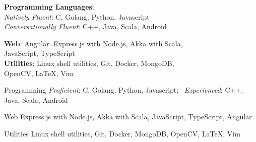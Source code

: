 \ifdefined\ONEPAGE
\textbf{Programming Languages}:\\
\quad \textit{Natively Fluent}: C, Golang, Python, Javascript\\
\quad \textit{Conversationally Fluent}: C++, Java, Scala, Android

\textbf{Web}:
Angular. Express.js with Node.js, Akka with Scala,\\
\quad JavaScript, TypeScript\\

\textbf{Utilities}:
Linux shell utilities, Git, Docker, MongoDB,\\
\quad OpenCV, \LaTeX, Vim
\else
\begin{cvskills}

  \cvskill
  {Programming}
  {\textit{Proficient}: C, Golang, Python, Javascript; \
    \textit{Experienced}: C++, Java, Scala, Android}

  \cvskill
  {Web}
  {Express.js with Node.js, Akka with Scala, JavaScript, TypeScript, Angular}

  \cvskill
  {Utilities}
  {Linux shell utilities, Git, Docker,
    MongoDB, OpenCV, \LaTeX, Vim}

\end{cvskills}
\fi

